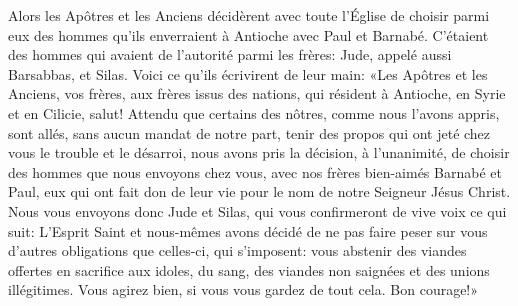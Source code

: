 Alors les Apôtres et les Anciens décidèrent avec toute l’Église
	de choisir parmi eux des hommes qu’ils enverraient à Antioche avec Paul et Barnabé.
C’étaient des hommes qui avaient de l’autorité parmi les frères:
	Jude, appelé aussi Barsabbas, et Silas.
Voici ce qu’ils écrivirent de leur main:
	«Les Apôtres et les Anciens, vos frères, aux frères issus des nations,
	qui résident à Antioche, en Syrie et en Cilicie, salut!
Attendu que certains des nôtres, comme nous l’avons appris,
	sont allés, sans aucun mandat de notre part,
	tenir des propos qui ont jeté chez vous le trouble et le désarroi,
	nous avons pris la décision, à l’unanimité,
	de choisir des hommes que nous envoyons chez vous,
	avec nos frères bien-aimés Barnabé et Paul,
	eux qui ont fait don de leur vie pour le nom de notre Seigneur Jésus Christ.
Nous vous envoyons donc Jude et Silas,
	qui vous confirmeront de vive voix ce qui suit:
	L’Esprit Saint et nous-mêmes avons décidé de ne pas faire peser sur vous
	d’autres obligations que celles-ci, qui s’imposent:
	vous abstenir des viandes offertes en sacrifice aux idoles,
	du sang, des viandes non saignées et des unions illégitimes.
Vous agirez bien, si vous vous gardez de tout cela.
	Bon courage!»
